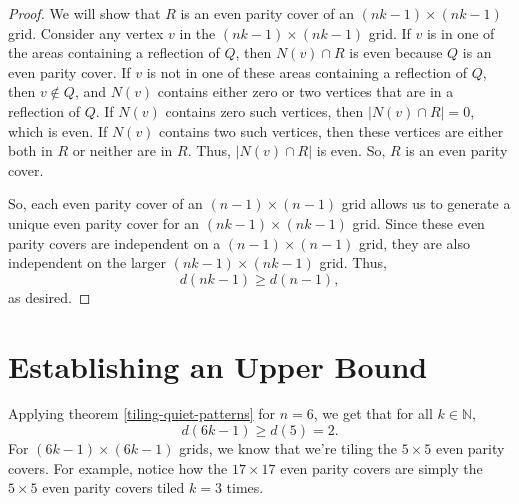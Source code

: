 \documentclass[a4paper]{article}
\newcommand{\N}{\mathbb{N}}
\newcommand{\abs}[1]{\left| #1 \right|}
\begin{document}
\begin{proof}
		We will show that $R$ is an even parity cover of an $(nk - 1) \times (nk - 1)$ grid.
		Consider any vertex $v$ in the $(nk-1) \times (nk-1)$ grid.
		If $v$ is in one of the areas containing a reflection of $Q$, then $N(v) \cap R$ is even because $Q$ is an even parity cover.
		If $v$ is not in one of these areas containing a reflection of $Q$, then $v \not\in Q$, and $N(v)$ contains either zero or two vertices that are in a reflection of $Q$.
		If $N(v)$ contains zero such vertices, then $\abs{N(v) \cap R} = 0$, which is even.
		If $N(v)$ contains two such vertices, then these vertices are either both in $R$ or neither are in $R$.
		Thus, $\abs{N(v) \cap R}$ is even.
		So, $R$ is an even parity cover.
		
		So, each even parity cover of an $(n-1) \times (n-1)$ grid allows us to generate a unique even parity cover for an $(nk-1) \times (nk-1)$ grid.
		Since these even parity covers are independent on a $(n-1) \times (n-1)$ grid, they are also independent on the larger $(nk-1) \times (nk-1)$ grid.
		Thus,
		\begin{equation*}
			d(nk-1) \geq d(n-1),
		\end{equation*}
		as desired.
	\end{proof}

	\section{Establishing an Upper Bound}
	Applying theorem \ref{tiling-quiet-patterns} for $n=6$, we get that for all $k \in \N$,
	\begin{equation*}
		d(6k - 1) \geq d(5) = 2.
	\end{equation*}
	For $(6k-1) \times (6k-1)$ grids, we know that we're tiling the $5 \times5 $ even parity covers.
	For example, notice how the $17 \times 17$ even parity covers are simply the $5 \times 5$ even parity covers tiled $k=3$ times.
	
\end{document}
